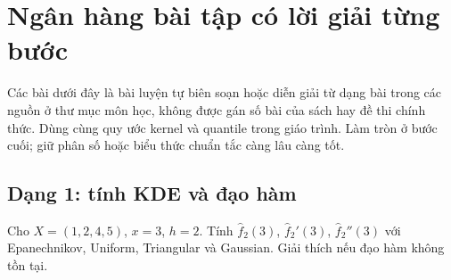 \chapter{Ngân hàng bài tập có lời giải từng bước}\label{ch:exercises}
Các bài dưới đây là bài luyện tự biên soạn hoặc diễn giải từ dạng bài
trong các nguồn ở thư mục môn học, không được gán số bài của sách hay
đề thi chính thức. Dùng cùng quy ước kernel và quantile trong giáo trình.
Làm tròn ở bước cuối; giữ phân số hoặc biểu thức chuẩn tắc càng lâu càng tốt.

\section{Dạng 1: tính KDE và đạo hàm}
\begin{exercise}\label{ex:original}
Cho $X=(1,2,4,5)$, $x=3$, $h=2$. Tính $\widehat f_2(3)$,
$\widehat f_2'(3)$, $\widehat f_2''(3)$ với Epanechnikov, Uniform,
Triangular và Gaussian. Giải thích nếu đạo hàm không tồn tại.
\end{exercise}
